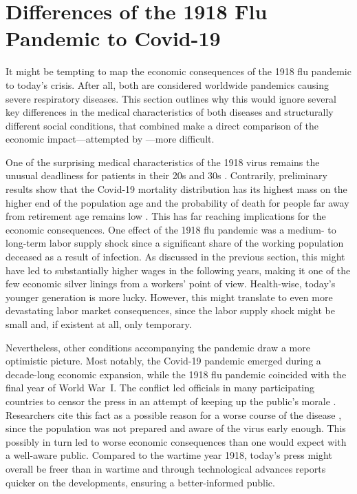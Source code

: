 \documentclass[12pt,a4paper]{article}
\begin{document}
\section{Differences of the 1918 Flu Pandemic to Covid-19}

It might be tempting to map the economic consequences of the 1918 flu pandemic to today's crisis.
After all, both are considered worldwide pandemics causing severe respiratory diseases.
This section outlines why this would ignore several key differences in the medical characteristics of both diseases and structurally different social conditions, that combined make a direct comparison of the economic impact---attempted by \cite{barroCoronavirusGreatInfluenza2020}---more difficult.

One of the surprising medical characteristics of the 1918 virus remains the unusual deadliness for patients in their 20s and 30s \citep{taubenberger1918InfluenzaMother2006}.
Contrarily, preliminary results show that the Covid-19 mortality distribution has its highest mass on the higher end of the population age and the probability of death for people far away from retirement age remains low \citep{weissClinicalCourseMortality2020, zhouClinicalCourseRisk2020}.
This has far reaching implications for the economic consequences.
One effect of the 1918 flu pandemic was a medium- to long-term labor supply shock since a significant share of the working population deceased as a result of infection.
As discussed in the previous section, this might have led to substantially higher wages in the following years, making it one of the few economic silver linings from a workers' point of view.
Health-wise, today's younger generation is more lucky.
However, this might translate to even more devastating labor market consequences, since the labor supply shock might be small and, if existent at all, only temporary.

Nevertheless, other conditions accompanying the pandemic draw a more optimistic picture.
Most notably, the Covid-19 pandemic emerged during a decade-long economic expansion, while the 1918 flu pandemic coincided with the final year of World War~I.
The conflict led officials in many participating countries to censor the press in an attempt of keeping up the public's morale \citep{chafeeFreedomSpeechWar1919}.
Researchers cite this fact as a possible reason for a worse course of the disease \citep{madhavModelingModernDay2013}, since the population was not prepared and aware of the virus early enough. This possibly in turn led to worse economic consequences than one would expect with a well-aware public.
Compared to the wartime year 1918, today's press might overall be freer than in wartime and through technological advances reports quicker on the developments, ensuring a better-informed public.
\end{document}
